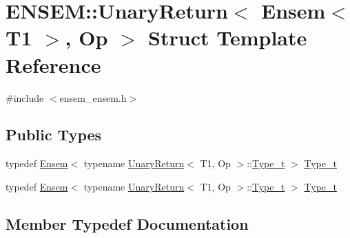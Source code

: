 \hypertarget{structENSEM_1_1UnaryReturn_3_01Ensem_3_01T1_01_4_00_01Op_01_4}{}\section{E\+N\+S\+EM\+:\+:Unary\+Return$<$ Ensem$<$ T1 $>$, Op $>$ Struct Template Reference}
\label{structENSEM_1_1UnaryReturn_3_01Ensem_3_01T1_01_4_00_01Op_01_4}


{\ttfamily \#include $<$ensem\+\_\+ensem.\+h$>$}

\subsection*{Public Types}
\begin{DoxyCompactItemize}
\item 
typedef \mbox{\hyperlink{classENSEM_1_1Ensem}{Ensem}}$<$ typename \mbox{\hyperlink{structENSEM_1_1UnaryReturn}{Unary\+Return}}$<$ T1, Op $>$\+::\mbox{\hyperlink{structENSEM_1_1UnaryReturn_3_01Ensem_3_01T1_01_4_00_01Op_01_4_a224980bb4b2ff570eb5fcf4036421962}{Type\+\_\+t}} $>$ \mbox{\hyperlink{structENSEM_1_1UnaryReturn_3_01Ensem_3_01T1_01_4_00_01Op_01_4_a224980bb4b2ff570eb5fcf4036421962}{Type\+\_\+t}}
\item 
typedef \mbox{\hyperlink{classENSEM_1_1Ensem}{Ensem}}$<$ typename \mbox{\hyperlink{structENSEM_1_1UnaryReturn}{Unary\+Return}}$<$ T1, Op $>$\+::\mbox{\hyperlink{structENSEM_1_1UnaryReturn_3_01Ensem_3_01T1_01_4_00_01Op_01_4_a224980bb4b2ff570eb5fcf4036421962}{Type\+\_\+t}} $>$ \mbox{\hyperlink{structENSEM_1_1UnaryReturn_3_01Ensem_3_01T1_01_4_00_01Op_01_4_a224980bb4b2ff570eb5fcf4036421962}{Type\+\_\+t}}
\end{DoxyCompactItemize}


\subsection{Member Typedef Documentation}
\mbox{\label{structENSEM_1_1UnaryReturn_3_01Ensem_3_01T1_01_4_00_01Op_01_4_a224980bb4b2ff570eb5fcf4036421962}} 
